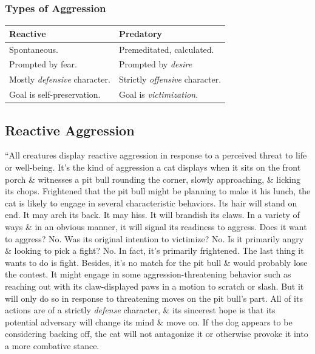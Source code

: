 \documentclass{article}
\numberwithin{equation}{section}
\begin{document}
\subsubsection{Types of Aggression}

\begin{table}[H]
	\centering
	\begin{tabular}{|l|l|}
		\hline
		\textbf{Reactive} & \textbf{Predatory} \\
		\hline
		Spontaneous. & Premeditated, calculated. \\
		\hline
		Prompted by fear. & Prompted by \textit{desire} \\
		\hline
		Mostly \textit{defensive} character. &  Strictly \textit{offensive} character. \\
		\hline
		Goal is self-preservation. & Goal is \textit{victimization}. \\
		\hline
	\end{tabular}
\end{table}

\subsection{Reactive Aggression}
``All creatures display reactive aggression in response to a perceived threat to life or well-being. It's the kind of aggression a cat displays when it sits on the front porch \& witnesses a pit bull rounding the corner, slowly approaching, \& licking its chops. Frightened that the pit bull might be planning to make it his lunch, the cat is likely to engage in several characteristic behaviors. Its hair will stand on end. It may arch its back. It may hiss. It will brandish its claws. In a variety of ways \& in an obvious manner, it will signal its readiness to aggress. Does it want to aggress? No. Was its original intention to victimize? No. Is it primarily angry \& looking to pick a fight? No. In fact, it's primarily frightened. The last thing it wants to do is fight. Besides, it's no match for the pit bull \& would probably lose the contest. It might engage in some aggression-threatening behavior such as reaching out with its claw-displayed paws in a motion to scratch or slash. But it will only do so in response to threatening moves on the pit bull's part. All of its actions are of a strictly \textit{defense} character, \& its sincerest hope is that its potential adversary will change its mind \& move on. If the dog appears to be considering backing off, the cat will not antagonize it or otherwise provoke it into a more combative stance.
\end{document}
